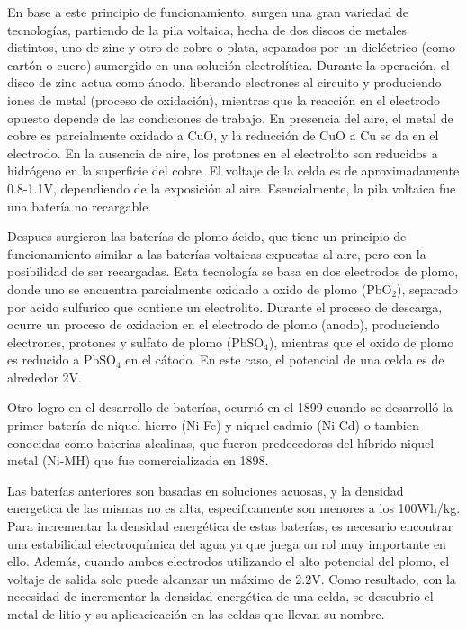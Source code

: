 \documentclass[10pt,a4paper]{article}
\begin{document}
    \noindent En base a este principio de funcionamiento, surgen una gran 
    variedad de tecnologías, partiendo de la pila voltaica, hecha de dos discos
    de metales distintos, uno de zinc y otro de cobre o plata, separados por un
    dieléctrico (como cartón o cuero) sumergido en una solución electrolítica.
    Durante la operación, el disco de zinc actua como ánodo, liberando
    electrones al circuito y produciendo iones de metal (proceso de oxidación),
    mientras que la reacción en el electrodo opuesto depende de las condiciones
    de trabajo. En presencia del aire, el metal de cobre es parcialmente
    oxidado a CuO, y la reducción de CuO a Cu se da en el electrodo. En la
    ausencia de aire, los protones en el electrolito son reducidos a hidrógeno
    en la superficie del cobre. El voltaje de la celda es de aproximadamente
    0.8-1.1V, dependiendo de la exposición al aire. Esencialmente, la pila
    voltaica fue una batería no recargable.
    
    \noindent Despues surgieron las baterías de plomo-ácido, que tiene un 
    principio de funcionamiento similar a las baterías voltaicas expuestas al 
    aire, pero con la posibilidad de ser recargadas. Esta tecnología se basa en 
    dos electrodos de plomo, donde uno se encuentra parcialmente oxidado a 
    oxido de plomo ($\mathrm{PbO_2}$), separado por acido sulfurico que contiene un 
    electrolito. Durante el proceso de descarga, ocurre un proceso de oxidacion 
    en el electrodo de plomo (anodo), produciendo electrones, protones y 
    sulfato de plomo ($\mathrm{PbSO_4}$), mientras que el oxido de plomo es 
    reducido a $\mathrm{PbSO_4}$ en el cátodo. En este caso, el potencial de 
    una celda es de alrededor 2V.
    
    \noindent Otro logro en el desarrollo de baterías, ocurrió en el 1899 cuando 
    se desarrolló la primer batería de niquel-hierro (Ni-Fe) y niquel-cadmio
    (Ni-Cd) o tambien conocidas como baterias alcalinas, que fueron
    predecedoras del híbrido niquel-metal (Ni-MH) que fue comercializada en
    1898.
    
    \noindent Las baterías anteriores son basadas en soluciones acuosas, y la
    densidad energetica de las mismas no es alta, especificamente son menores a
    los 100Wh/kg. Para incrementar la densidad energética de estas baterías, es necesario
    encontrar una estabilidad electroquímica del agua ya que juega un rol muy
    importante en ello. Además, cuando ambos electrodos utilizando el alto 
    potencial del plomo, el voltaje de salida solo puede alcanzar un 
    máximo de 2.2V. Como resultado, con la necesidad de incrementar la densidad
    energética de una celda, se descubrio el metal de litio y su aplicacicación
    en las celdas que llevan su nombre.
\end{document}
